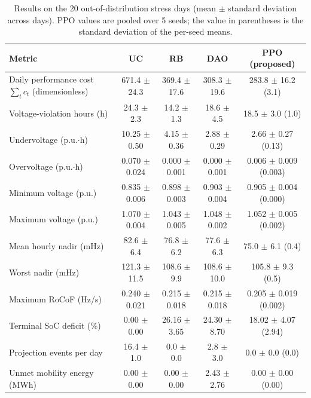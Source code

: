 \begin{table}[!t]
\caption{Results on the 20 out-of-distribution stress days (mean $\pm$ standard deviation across days). PPO values are pooled over 5 seeds; the value in parentheses is the standard deviation of the per-seed means.}
\label{tab:stress}
\centering
\footnotesize
\begin{tabular}{lcccc}
\toprule
\textbf{Metric} & \textbf{UC} & \textbf{RB} & \textbf{DAO} & \textbf{PPO (proposed)}\\
\midrule
Daily performance cost $\sum_t c_t$ (dimensionless) & 671.4 $\pm$ 24.3 & 369.4 $\pm$ 17.6 & 308.3 $\pm$ 19.6 & 283.8 $\pm$ 16.2 (3.1) \\
Voltage-violation hours (h) & 24.3 $\pm$ 2.3 & 14.2 $\pm$ 1.3 & 18.6 $\pm$ 4.5 & 18.5 $\pm$ 3.0 (1.0) \\
Undervoltage (p.u.$\cdot$h) & 10.25 $\pm$ 0.50 & 4.15 $\pm$ 0.36 & 2.88 $\pm$ 0.29 & 2.66 $\pm$ 0.27 (0.13) \\
Overvoltage (p.u.$\cdot$h) & 0.070 $\pm$ 0.024 & 0.000 $\pm$ 0.001 & 0.000 $\pm$ 0.001 & 0.006 $\pm$ 0.009 (0.003) \\
Minimum voltage (p.u.) & 0.835 $\pm$ 0.006 & 0.898 $\pm$ 0.003 & 0.903 $\pm$ 0.004 & 0.905 $\pm$ 0.004 (0.000) \\
Maximum voltage (p.u.) & 1.070 $\pm$ 0.004 & 1.043 $\pm$ 0.005 & 1.048 $\pm$ 0.002 & 1.052 $\pm$ 0.005 (0.002) \\
Mean hourly nadir (mHz) & 82.6 $\pm$ 6.4 & 76.8 $\pm$ 6.2 & 77.6 $\pm$ 6.3 & 75.0 $\pm$ 6.1 (0.4) \\
Worst nadir (mHz) & 121.3 $\pm$ 11.5 & 108.6 $\pm$ 9.9 & 108.6 $\pm$ 10.0 & 105.8 $\pm$ 9.3 (0.5) \\
Maximum RoCoF (Hz/s) & 0.240 $\pm$ 0.021 & 0.215 $\pm$ 0.018 & 0.215 $\pm$ 0.018 & 0.205 $\pm$ 0.019 (0.002) \\
Terminal SoC deficit (\%) & 0.00 $\pm$ 0.00 & 26.16 $\pm$ 3.65 & 24.30 $\pm$ 8.70 & 18.02 $\pm$ 4.07 (2.94) \\
Projection events per day & 16.4 $\pm$ 1.0 & 0.0 $\pm$ 0.0 & 2.8 $\pm$ 3.0 & 0.0 $\pm$ 0.0 (0.0) \\
Unmet mobility energy (MWh) & 0.00 $\pm$ 0.00 & 0.00 $\pm$ 0.00 & 2.43 $\pm$ 2.76 & 0.00 $\pm$ 0.00 (0.00) \\
\bottomrule
\end{tabular}
\end{table}
